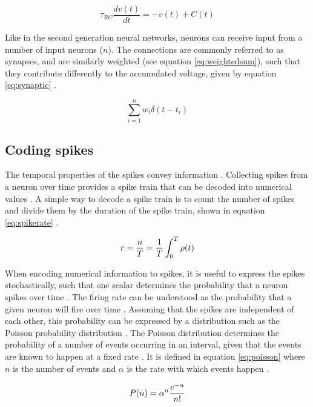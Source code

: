 \documentclass[report.tex]{subfiles}
\begin{document}
\begin{equation}
  \tau_{RC}\frac{dv(t)}{dt} = -v(t) + C(t)
  \label{eq:lif}
\end{equation}

Like in the second generation neural networks, neurons
can receive input from a number of input neurons ($n$).
The connections are commonly referred to as synapses, and are similarly
weighted (see equation \ref{eq:weightedsum}), 
such that they contribute differently to the accumulated 
voltage, given by equation \ref{eq:synaptic} \cite{Dayan2001}.

\begin{equation}
  \sum_{i=1}^n{w_i\delta(t - t_i)}
  \label{eq:synaptic}
\end{equation}

\subsection{Coding spikes}
The temporal properties of the spikes convey information \cite{Dayan2001}.
Collecting spikes from a neuron over time provides a 
spike train that can be decoded into numerical
values \cite{Dayan2001}.
A simple way to decode a spike train is to count the number of
spikes and divide them by the duration of the spike train, shown in
equation \ref{eq:spikerate}
\cite{Dayan2001}.

\begin{equation}
  r = {n \over T} = {1 \over T} \int_0^T \rho(t)
\label{eq:spikerate}
\end{equation}

When encoding numerical information to spikes, it is useful to 
express the spikes stochastically, such that one scalar determines
the probability that a neuron spikes over time \cite{Dayan2001}.
The firing rate can be understood as the probability that a given
neuron will fire over time \cite{Dayan2001}.
Assuming that the spikes are independent of each other, this
probability can be expressed by a distribution such as the
Poisson probability distribution
\cite{Dayan2001}.
The Poisson distribution determines the probability of a number
of events occurring in an interval, given that the events are
known to happen at a fixed rate \cite{Dayan2001}.
It is defined in equation \ref{eq:poisson} where $n$ is the
number of events and $\alpha$ is the rate with which events
happen \cite{Dayan2001}.

\begin{equation}
P(n) = \alpha^n {e^{-\alpha} \over n!}
\label{eq:poisson}
\end{equation}
\end{document}

